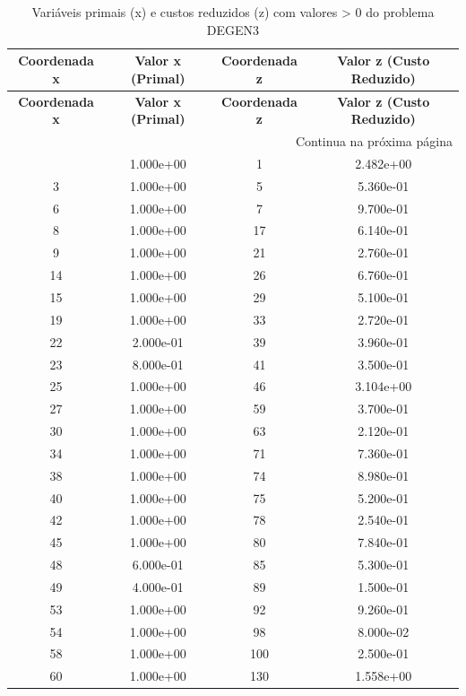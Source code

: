 \documentclass[12pt]{article}
\begin{document}
\begin{longtable}{@{}cccc@{}}
\caption{Variáveis primais (x) e custos reduzidos (z) com valores > 0 do problema DEGEN3} \\
\toprule
\textbf{Coordenada x} & \textbf{Valor x (Primal)} & \textbf{Coordenada z} & \textbf{Valor z (Custo Reduzido)} \\
\midrule
\endfirsthead

\toprule
\textbf{Coordenada x} & \textbf{Valor x (Primal)} & \textbf{Coordenada z} & \textbf{Valor z (Custo Reduzido)} \\
\midrule
\endhead

\midrule \multicolumn{4}{r}{{Continua na próxima página}} \\ \midrule
\endfoot

\bottomrule
\endlastfoot
2 & 1.000e+00 & 1 & 2.482e+00 \\
3 & 1.000e+00 & 5 & 5.360e-01 \\
6 & 1.000e+00 & 7 & 9.700e-01 \\
8 & 1.000e+00 & 17 & 6.140e-01 \\
9 & 1.000e+00 & 21 & 2.760e-01 \\
14 & 1.000e+00 & 26 & 6.760e-01 \\
15 & 1.000e+00 & 29 & 5.100e-01 \\
19 & 1.000e+00 & 33 & 2.720e-01 \\
22 & 2.000e-01 & 39 & 3.960e-01 \\
23 & 8.000e-01 & 41 & 3.500e-01 \\
25 & 1.000e+00 & 46 & 3.104e+00 \\
27 & 1.000e+00 & 59 & 3.700e-01 \\
30 & 1.000e+00 & 63 & 2.120e-01 \\
34 & 1.000e+00 & 71 & 7.360e-01 \\
38 & 1.000e+00 & 74 & 8.980e-01 \\
40 & 1.000e+00 & 75 & 5.200e-01 \\
42 & 1.000e+00 & 78 & 2.540e-01 \\
45 & 1.000e+00 & 80 & 7.840e-01 \\
48 & 6.000e-01 & 85 & 5.300e-01 \\
49 & 4.000e-01 & 89 & 1.500e-01 \\
53 & 1.000e+00 & 92 & 9.260e-01 \\
54 & 1.000e+00 & 98 & 8.000e-02 \\
58 & 1.000e+00 & 100 & 2.500e-01 \\
60 & 1.000e+00 & 130 & 1.558e+00 \\

\end{longtable}
\end{document}
